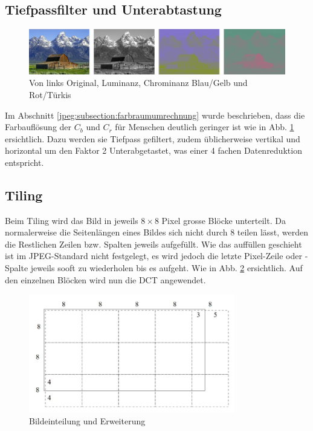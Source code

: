 \subsection{Tiefpassfilter und Unterabtastung
\label{jpeg:subsection:tiefpass}}

\begin{figure}
    \centering
    \includegraphics[width=\linewidth]{papers/jpeg/pictures/ycbcr.pdf}
    \caption{Von links Original, Luminanz, Chrominanz Blau/Gelb und Rot/Türkis
        \label{jpeg:fig:ycbcr}}
\end{figure}

Im Abschnitt \ref{jpeg:subsection:farbraumumrechnung} wurde beschrieben, dass die Farbauflösung der \(C_b\) und \(C_r\) für Menschen deutlich geringer ist wie in Abb. \ref{jpeg:fig:ycbcr} ersichtlich.
Dazu werden sie Tiefpass gefiltert, zudem üblicherweise vertikal und horizontal um den Faktor 2 Unterabgetastet, was einer 4 fachen Datenreduktion entspricht.

\subsection{Tiling
\label{jpeg:subsection:tiling}}
Beim Tiling wird das Bild in jeweils \(8\times8\) Pixel grosse Blöcke unterteilt.
Da normalerweise die Seitenlängen eines Bildes sich nicht durch 8 teilen lässt, werden die Restlichen Zeilen bzw. Spalten jeweils aufgefüllt.
Wie das auffüllen geschieht ist im JPEG-Standard nicht festgelegt, es wird jedoch die letzte Pixel-Zeile oder -Spalte jeweils sooft zu wiederholen bis es aufgeht.
Wie in Abb. \ref{jpeg:fig:tiling} ersichtlich.
Auf den einzelnen Blöcken wird nun die DCT angewendet.

\begin{figure}
    \centering
    \includegraphics[width=90mm]{papers/jpeg/pictures/unterteilung.pdf}
    \caption{Bildeinteilung und Erweiterung
        \label{jpeg:fig:tiling}}
\end{figure}

